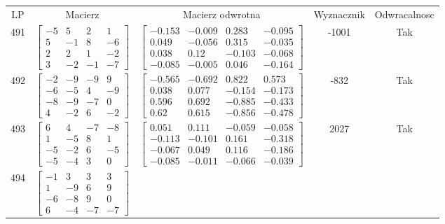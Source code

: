 \documentclass[a4paper,12pt]{article}
\begin{document}
\bgroup {} \vspace{0.2in} \begin{tabular}{c c c c c}
LP & Macierz & Macierz odwrotna & Wyznacznik & Odwracalnosc\\
491
&
$\begin{bmatrix} -5 & 5 & 2 & 1 \\ 5 & -1 & 8 & -6 \\ 2 & 2 & 1 & -2 \\ 3 & -2 & -1 & -7 \end{bmatrix}$
&
$\begin{bmatrix} -0.153 & -0.009 & 0.283 & -0.095 \\ 0.049 & -0.056 & 0.315 & -0.035 \\ 0.038 & 0.12 & -0.103 & -0.068 \\ -0.085 & -0.005 & 0.046 & -0.164 \end{bmatrix}$
&
-1001
&
Tak
\\
492
&
$\begin{bmatrix} -2 & -9 & -9 & 9 \\ -6 & -5 & 4 & -9 \\ -8 & -9 & -7 & 0 \\ 4 & -2 & 6 & -2 \end{bmatrix}$
&
$\begin{bmatrix} -0.565 & -0.692 & 0.822 & 0.573 \\ 0.038 & 0.077 & -0.154 & -0.173 \\ 0.596 & 0.692 & -0.885 & -0.433 \\ 0.62 & 0.615 & -0.856 & -0.478 \end{bmatrix}$
&
-832
&
Tak
\\
493
&
$\begin{bmatrix} 6 & 4 & -7 & -8 \\ 1 & -5 & 8 & 1 \\ -5 & -2 & 6 & -5 \\ -5 & -4 & 3 & 0 \end{bmatrix}$
&
$\begin{bmatrix} 0.051 & 0.111 & -0.059 & -0.058 \\ -0.113 & -0.101 & 0.161 & -0.318 \\ -0.067 & 0.049 & 0.116 & -0.186 \\ -0.085 & -0.011 & -0.066 & -0.039 \end{bmatrix}$
&
2027
&
Tak
\\
494
&
$\begin{bmatrix} -1 & 3 & 3 & 3 \\ 1 & -9 & 6 & 9 \\ -6 & -8 & 9 & 0 \\ 6 & -4 & -7 & -7 \end{bmatrix}$

\end{tabular}
\end{document}
